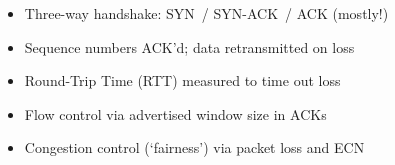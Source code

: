 \begin{frame}
\begin{columns}[T]
\begin{itemize}
	\pause

	\item Three-way handshake: SYN~/ SYN-ACK~/ ACK (mostly!)

	\pause

	\item Sequence numbers ACK'd; data retransmitted on loss

	\pause

	\item Round-Trip Time (RTT) measured to time out loss

	\pause

        \item Flow control via advertised window size in ACKs

	\pause

	\item Congestion control (`fairness') via packet loss and ECN


      \end{itemize}

  \end{columns}
\end{frame}

